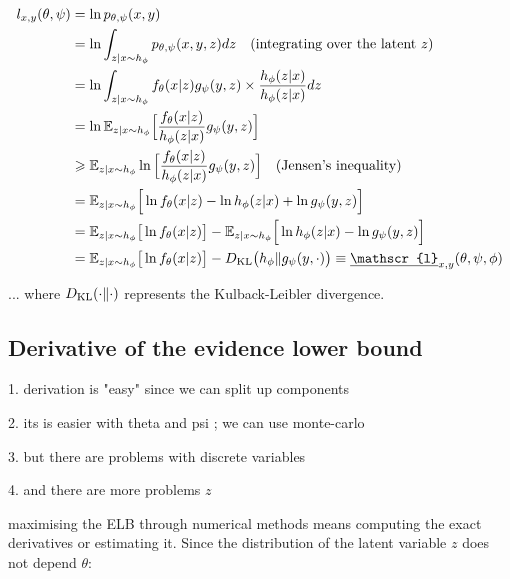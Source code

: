 \documentclass{article}
\begin{document}
\begin{appendix}
\begin{align*}
l_{x,y}(\theta,\psi)&=\ln p_{\theta,\psi}(x,y)\\
&=\ln \int_{z|x \sim h_\phi} p_{\theta,\psi}(x,y,z) dz  \quad \text{(integrating over the latent $z$)} \\
&=\ln \int_{z|x \sim h_\phi} f_{\theta}(x|z)g_\psi(y,z)\times\frac{h_\phi(z|x)}{h_\phi(z|x)} dz \\
&=\ln \mathbb{E}_{z|x \sim h_\phi} \Big[ \frac{f_{\theta}(x|z)}{h_\phi(z|x)}g_\psi(y,z)  \Big]\\
&\geqslant  \mathbb{E}_{z|x \sim h_\phi} \ln \Big[ \frac{f_{\theta}(x|z)}{h_\phi(z|x)}g_\psi(y,z)  \Big] \quad \text{(Jensen's inequality)} \\
& = \mathbb{E}_{z|x \sim h_\phi} \Big[ \ln f_{\theta}(x|z) - \ln h_\phi(z|x) + \ln g_\psi(y,z)  \Big] \\
& = \mathbb{E}_{z|x \sim h_\phi} \big[ \ln f_{\theta}(x|z) \big]- \mathbb{E}_{z|x \sim h_\phi}\Big[\ln h_\phi(z|x) - \ln g_\psi(y,z)  \Big] \\
& = \mathbb{E}_{z|x \sim h_\phi} \big[ \ln f_{\theta}(x|z) \big]-\KL \big(h_\phi \| g_\psi(y,\cdot) \big) \equiv \underline{\mathscr{l}}_{x,y}(\theta,\psi,\phi)
\end{align*}

... where $D_{\mathrm{KL}}(\cdot\|\cdot)$ represents the Kulback-Leibler divergence.

\begin{multicols}{2}


\subsection{Derivative of the evidence lower bound} \label{app:elbderivative}

1. derivation is "easy" since we can split up components

2. its is easier with theta and psi ; we can use monte-carlo

3. but there are problems with discrete variables

4. and there are more problems $z$

maximising the ELB through numerical methods means computing the exact derivatives or estimating it. Since the distribution of the latent variable $z$ does not depend $\theta$:


\end{multicols}
\end{appendix}
\end{document}

